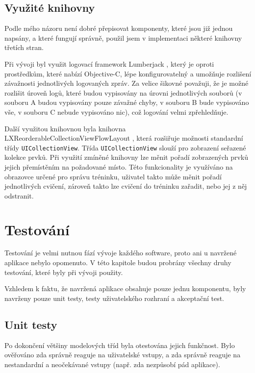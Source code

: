 \documentclass[thesis=B,czech]{FITthesis}[2012/06/26]
\begin{document}
	\section{Využité knihovny}

	Podle mého názoru není dobré přepisovat komponenty, které jsou již jednou napsány, a které fungují správně, použil jsem v implementaci některé knihovny třetích stran.

	Při vývoji byl využit logovací framework Lumberjack \cite{lumberjackOnline}, který je oproti prostředkům, které nabízí Objective-C, lépe konfigurovatelný a umožňuje rozlišení závažnosti jednotlivých logovaných zpráv. Za velice šikovné považuji, že je možné rozlišit úroveň logů, které budou vypisovány na úrovni jednotlivých souborů (v souboru A budou vypisovány pouze závažné chyby, v souboru B bude vypisováno vše, v souboru C nebude vypisováno nic), což logování velmi zpřehledňuje.

	Další využitou knihovnou byla knihovna LXReorderableCollectionViewFlowLayout \cite{reorderableCollectionViewOnline}, která rozšiřuje možnosti standardní třídy \verb|UICollectionView|. Třída \verb|UICollectionView| slouží pro zobrazení seřazené kolekce prvků. Při využití zmíněné knihovny lze měnit pořadí zobrazených prvků jejich přemístěním na požadované místo. Této funkcionality je využíváno na obrazovce určené pro správu tréninku, uživatel takto může měnit pořadí jednotlivých cvičení, zároveň takto lze cvičení do tréninku zařadit, nebo jej z něj odstranit.

\chapter{Testování}

	Testování je velmi nutnou fází vývoje každého software, proto ani u navržené aplikace nebylo opomenuto. V této kapitole budou probrány všechny druhy testování, které byly při vývoji použity.

	Vzhledem k faktu, že navržená aplikace obsahuje pouze jednu komponentu, byly navrženy pouze unit testy, testy uživatelského rozhraní a akceptační test.

\section{Unit testy}

	Po dokončení většiny modelových tříd byla otestována jejich funkčnost. Bylo ověřováno zda správně reaguje na uživatelské vstupy, a zda správně reaguje na nestandardní a neočekávané vstupy (např. zda nezpůsobí pád aplikace).
\end{document}
